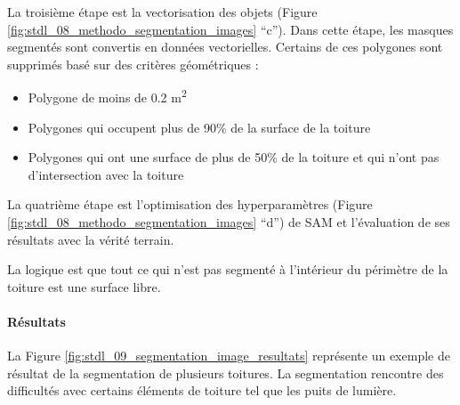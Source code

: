 \par{La troisième étape est la vectorisation des objets (Figure \ref{fig:stdl_08_methodo_segmentation_images} ``c''). Dans cette étape, les masques segmentés sont convertis en données vectorielles. Certains de ces polygones sont supprimés basé sur des critères géométriques :}
\begin{itemize}
    \item Polygone de moins de 0.2 \si{\unit{m^2}}
    \item Polygones qui occupent plus de 90\% de la surface de la toiture
    \item Polygones qui ont une surface de plus de 50\% de la toiture et qui n'ont pas d'intersection avec la toiture
\end{itemize}

\par{La quatrième étape est l'optimisation des hyperparamètres (Figure \ref{fig:stdl_08_methodo_segmentation_images} ``d'') de SAM et l'évaluation de ses résultats avec la vérité terrain.}

\par{La logique est que tout ce qui n'est pas segmenté à l'intérieur du périmètre de la toiture est une surface libre.}

\newpage
\paragraph{Résultats}

La Figure \ref{fig:stdl_09_segmentation_image_resultats} représente un exemple de résultat de la segmentation de plusieurs toitures. La segmentation rencontre des difficultés avec certains éléments de toiture tel que les puits de lumière.

